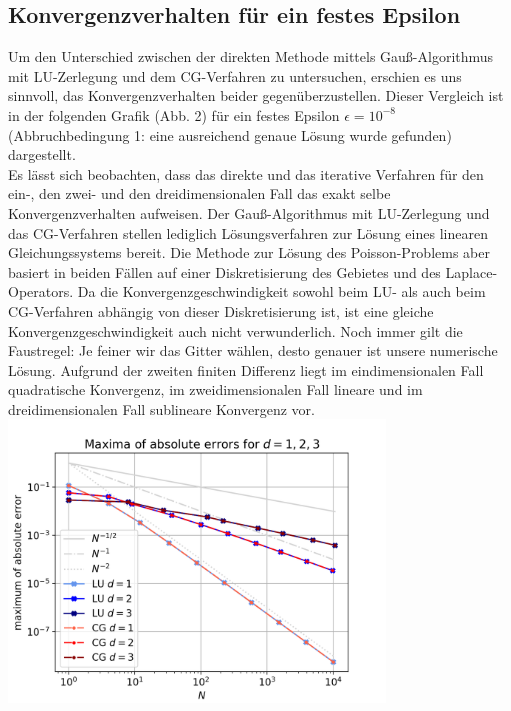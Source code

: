 \documentclass{scrartcl}
\begin{document}
\subsection{Konvergenzverhalten für ein festes Epsilon}
Um den Unterschied zwischen der direkten Methode mittels Gauß-Algorithmus mit LU-Zerlegung und dem CG-Verfahren zu untersuchen, erschien es uns sinnvoll, das Konvergenzverhalten beider gegenüberzustellen. 
Dieser Vergleich ist in der folgenden Grafik (Abb. 2) für ein festes Epsilon $\epsilon = 10^{-8}$ (Abbruchbedingung 1: eine ausreichend genaue Lösung wurde gefunden) dargestellt. \\
Es lässt sich beobachten, dass das direkte und das iterative Verfahren für den ein-, den zwei- und den dreidimensionalen Fall das exakt selbe Konvergenzverhalten aufweisen. 
Der Gauß-Algorithmus mit LU-Zerlegung und das CG-Verfahren stellen lediglich Lösungsverfahren zur Lösung eines linearen Gleichungssystems bereit. 
Die Methode zur Lösung des Poisson-Problems aber basiert in beiden Fällen auf einer Diskretisierung des Gebietes und des Laplace-Operators. 
Da die Konvergenzgeschwindigkeit sowohl beim LU- als auch beim CG-Verfahren abhängig von dieser Diskretisierung ist, ist eine gleiche Konvergenzgeschwindigkeit auch nicht verwunderlich. 
Noch immer gilt die Faustregel: Je feiner wir das Gitter wählen, desto genauer ist unsere numerische Lösung. 
Aufgrund der zweiten finiten Differenz liegt im eindimensionalen Fall quadratische Konvergenz, im zweidimensionalen Fall lineare und im dreidimensionalen Fall sublineare Konvergenz vor. \\


{
  \centering
    \includegraphics[width=0.75\textwidth]{Grafiken/compare}
    \vspace{-0.2cm}
}
\vspace{0.5cm}
\end{document}
